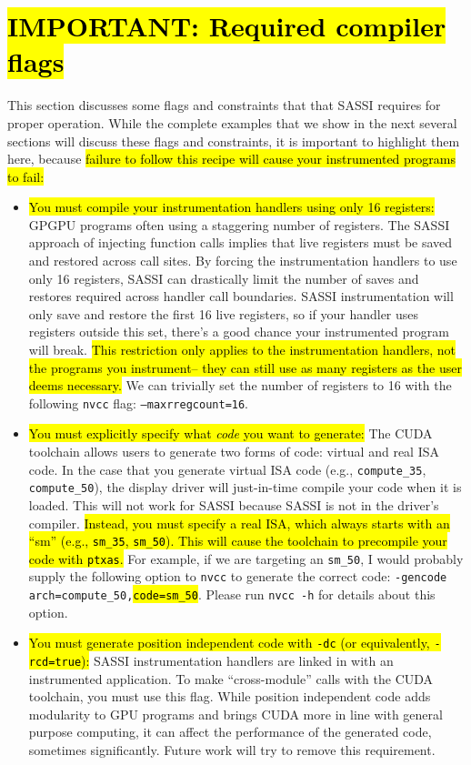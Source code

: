 \section{\hl{IMPORTANT: Required compiler flags}}
\label{sec:important-required}

This section discusses some flags and constraints that that SASSI
requires for proper operation.  While the complete examples that we
show in the next several sections will discuss these flags and
constraints, it is important to highlight them here, because \hl{
  failure to follow this recipe will cause your instrumented programs
  to fail:}

\begin{itemize}
  \item \hl{You must compile your instrumentation handlers using only
    16 registers:} GPGPU programs often using a staggering number of
    registers.  The SASSI approach of injecting function calls implies
    that live registers must be saved and restored across call sites.
    By forcing the instrumentation handlers to use only 16 registers,
    SASSI can drastically limit the number of saves and restores
    required across handler call boundaries.  SASSI instrumentation
    will only save and restore the first 16 live registers, so if your
    handler uses registers outside this set, there's a good chance
    your instrumented program will break.  \hl{This restriction only
      applies to the instrumentation handlers, not the programs you
      instrument-- they can still use as many registers as the user deems
      necessary.}  We can trivially set the number of registers to 16
    with the following \texttt{nvcc} flag:
    \texttt{--maxrregcount=16}.
  \item \hl{You must explicitly specify what \emph{code} you want to
    generate:} The CUDA toolchain allows users to generate two forms
    of code: virtual and real ISA code.  In the case that you generate
    virtual ISA code (e.g., \texttt{compute\_35}, \texttt{compute\_50}), the display
    driver will just-in-time compile your code when it is loaded.
    This will not work for SASSI because SASSI is not in the driver's
    compiler.  \hl{Instead, you must specify a real ISA, which always
    starts with an ``sm'' (e.g., \texttt{sm\_35}, \texttt{sm\_50}).  This will cause the
    toolchain to precompile your code with \texttt{ptxas}.}  For
    example, if we are targeting an \texttt{sm\_50}, I would probably
    supply the following option to \texttt{nvcc} to generate the
    correct code: \texttt{-gencode arch=compute\_50,}\hl{\texttt{code=sm\_50}}.
    Please run \texttt{nvcc -h} for details about this option.
  \item \hl{You must generate position independent code with
    \texttt{-dc} (or equivalently, \texttt{-rcd=true}):} SASSI
    instrumentation handlers are linked in with an instrumented
    application.  To make ``cross-module'' calls with the CUDA
    toolchain, you must use this flag.  While position independent
    code adds modularity to GPU programs and brings CUDA more in line
    with general purpose computing, it can affect the performance of
    the generated code, sometimes significantly.  Future work will try
    to remove this requirement.
\end{itemize}
